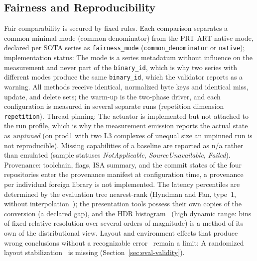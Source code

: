 \begin{nurkurz}
\subsection{Fairness and Reproducibility}\label{sec:fairness}
Fair comparability is secured by fixed rules. Each comparison separates a common minimal mode (common
denominator) from the PRT-ART native mode, declared per SOTA series as \texttt{fairness\_mode}
(\texttt{common\_denominator} or \texttt{native}); implementation status: The mode is a series metadatum
without influence on the measurement and never part of the \texttt{binary\_id}, which is why two series with
different modes produce the same \texttt{binary\_id}, which the validator reports as a warning. All methods
receive identical, normalized byte keys and identical miss, update, and delete sets; the warm-up is the
two-phase driver, and each configuration is measured in several separate runs (repetition dimension
\texttt{repetition}). Thread pinning: The actuator is implemented but not attached to the run profile, which
is why the measurement emission reports the actual state as \emph{unpinned} (on prod1 with two L3 complexes
of unequal size an unpinned run is not reproducible). Missing capabilities of a baseline are reported as n/a
rather than emulated (sample statuses \emph{NotApplicable}, \emph{SourceUnavailable}, \emph{Failed}).
Provenance: toolchain, flags, ISA summary, and the commit states of the four repositories enter the
provenance manifest at configuration time, a provenance per individual foreign library is not implemented.
The latency percentiles are determined by the evaluation tree nearest-rank (Hyndman and Fan, type~1, without
interpolation~\cite{hyndman1996quantiles}); the presentation tools possess their own copies of the
conversion (a declared gap), and the HDR histogram~\cite{tene_hdrhistogram} (high dynamic range: bins of
fixed relative resolution over several orders of magnitude) is a method of its own of the distributional
view. Layout and environment effects that produce wrong conclusions without a recognizable
error~\cite{mytkowicz2009wrongdata} remain a limit: A randomized layout
stabilization~\cite{curtsinger2013stabilizer} is missing (Section~\ref{sec:eval-validity}).
\end{nurkurz}

